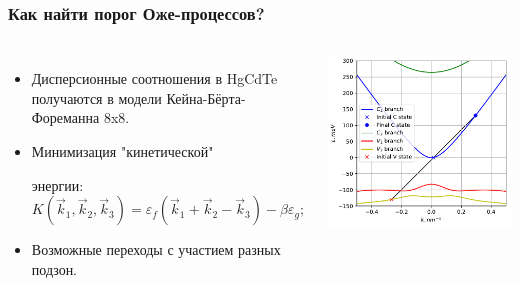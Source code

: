 \documentclass[9pt,pdf]{beamer}
\begin{document}
    \begin{frame}
        \frametitle{Как найти порог Оже-процессов?}
        \begin{columns}
            \begin{itemize}
                \item Дисперсионные соотношения в HgCdTe получаются 
                  в модели Кейна-Бёрта-Фореманна 8x8.
                \item Минимизация "кинетической" 
                
                энергии:
                  \begin{equation*}
                    K(\vec{k}_{1}, \vec{k}_{2}, \vec{k}_{3}) = 
                    \varepsilon_{f}(\vec{k}_{1} + \vec{k}_{2} - \vec{k}_{3}) - \beta \varepsilon_g;
                  \end{equation*}
    
                  \item Возможные переходы с участием разных подзон.
            \end{itemize}
            
            \begin{center}
              \includegraphics[width=\textwidth]{./images/add_pic.pdf}
            \end{center}
        \end{columns}
      \end{frame}
\end{document}
